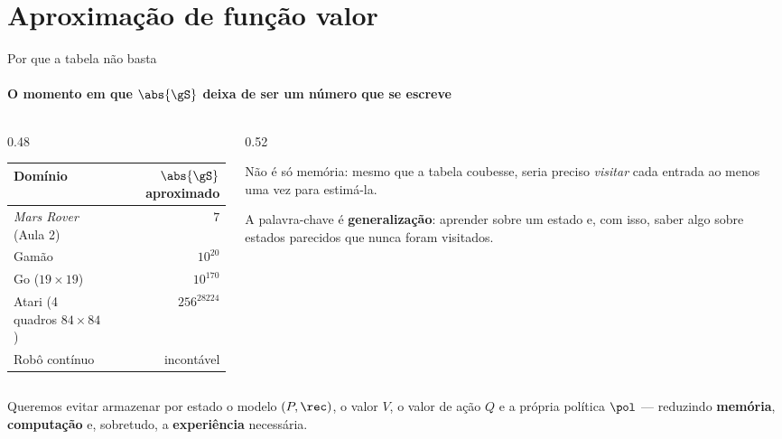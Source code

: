 \documentclass[aspectratio=169, 11pt]{beamer}
\begin{document}
\section{Aproximação de função valor}

\begin{frame}{Por que a tabela não basta}
  \framesubtitle{O momento em que $\abs{\gS}$ deixa de ser um número que se escreve}

  \begin{columns}[T]
    \begin{column}{0.48\textwidth}
      \begin{center}\small
      \begin{tabular}{lr}
        \toprule
        Domínio & $\abs{\gS}$ aproximado \\
        \midrule
        \emph{Mars Rover} (Aula 2) & $7$ \\
        Gamão & $10^{20}$ \\
        Go ($19\times19$) & $10^{170}$ \\
        Atari (4 quadros $84{\times}84$) & $256^{28224}$ \\
        Robô contínuo & incontável \\
        \bottomrule
      \end{tabular}
      \end{center}
    \end{column}
    \begin{column}{0.52\textwidth}
      \begin{alertabox}
        Não é só memória: mesmo que a tabela coubesse, seria preciso
        \emph{visitar} cada entrada ao menos uma vez para estimá-la.
      \end{alertabox}

      \begin{ideiabox}
        A palavra-chave é \textbf{generalização}: aprender sobre um estado
        e, com isso, saber algo sobre estados parecidos que nunca foram
        visitados.
      \end{ideiabox}
    \end{column}
  \end{columns}

  \smallskip
  {\small Queremos evitar armazenar por estado o modelo $(P,\rec)$, o valor
  $V$, o valor de ação $Q$ e a própria política $\pol$ --- reduzindo
  \textbf{memória}, \textbf{computação} e, sobretudo, a
  \textbf{experiência} necessária.}
\end{frame}
\end{document}
